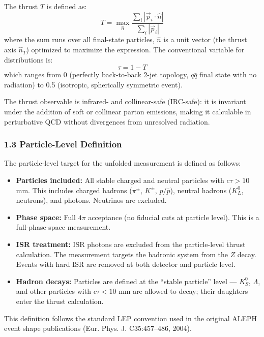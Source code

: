 \documentclass[11pt,]{article}
\providecommand{\tightlist}{%
  \setlength{\itemsep}{0pt}\setlength{\parskip}{0pt}}
\begin{document}
The thrust \(T\) is defined as:
\[T = \max_{\hat{n}} \frac{\sum_i |\vec{p}_i \cdot \hat{n}|}{\sum_i |\vec{p}_i|}\]
where the sum runs over all final-state particles, \(\hat{n}\) is a unit
vector (the thrust axis \(\hat{n}_T\)) optimized to maximize the
expression. The conventional variable for distributions is:
\[\tau = 1 - T\] which ranges from 0 (perfectly back-to-back 2-jet
topology, \(q\bar{q}\) final state with no radiation) to 0.5 (isotropic,
spherically symmetric event).

The thrust observable is infrared- and collinear-safe (IRC-safe): it is
invariant under the addition of soft or collinear parton emissions,
making it calculable in perturbative QCD without divergences from
unresolved radiation.

\hypertarget{particle-level-definition}{%
\subsubsection{1.3 Particle-Level
Definition}\label{particle-level-definition}}

The particle-level target for the unfolded measurement is defined as
follows:

\begin{itemize}
\tightlist
\item
  \textbf{Particles included:} All stable charged and neutral particles
  with \(c\tau > 10\) mm. This includes charged hadrons (\(\pi^\pm\),
  \(K^\pm\), \(p/\bar{p}\)), neutral hadrons (\(K^0_L\), neutrons), and
  photons. Neutrinos are excluded.
\item
  \textbf{Phase space:} Full \(4\pi\) acceptance (no fiducial cuts at
  particle level). This is a full-phase-space measurement.
\item
  \textbf{ISR treatment:} ISR photons are excluded from the
  particle-level thrust calculation. The measurement targets the
  hadronic system from the \(Z\) decay. Events with hard ISR are removed
  at both detector and particle level.
\item
  \textbf{Hadron decays:} Particles are defined at the ``stable
  particle'' level --- \(K_S^0\), \(\Lambda\), and other particles with
  \(c\tau < 10\) mm are allowed to decay; their daughters enter the
  thrust calculation.
\end{itemize}

This definition follows the standard LEP convention used in the original
ALEPH event shape publications (Eur. Phys. J. C35:457--486, 2004).
\end{document}
